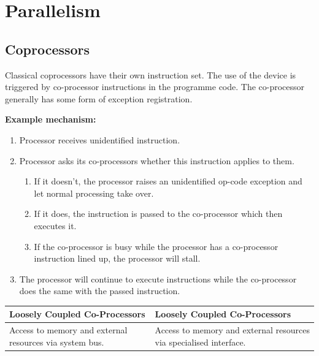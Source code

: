 \section{Parallelism }
	\subsection{Coprocessors }
	
		Classical coprocessors have their own instruction set. The use of the device is triggered by co-processor instructions in the programme code. The co-processor generally has some form of exception registration.
		
		\vspace{0.5cm}
		
		\textbf{Example mechanism:}
		
		\begin{enumerate}
		  \item Processor receives unidentified instruction.
		  \item Processor asks its co-processors whether this instruction applies to them.
		  \begin{enumerate}
			  \item If it doesn't, the processor raises an unidentified op-code exception and let normal processing take over.
			  \item If it does, the instruction is passed to the co-processor which then executes it.
			  \item If the co-processor is busy while the processor has a co-processor instruction lined up, the processor will stall.
		  \end{enumerate}	  
		  \item The processor will continue to execute instructions while the co-processor does the same with the passed instruction.
		\end{enumerate}


		\begin{table}[H]
			\centering
			\begin{tabular}{|p{0.425\textwidth}|p{}|}
				\hline
				\textbf{Loosely Coupled Co-Processors}
					& \textbf{Loosely Coupled Co-Processors}\\
				\hline
				Access to memory and external resources via system bus.
					& Access to memory and external resources via specialised interface.\\
				\hline
			\end{tabular}
		\end{table}
		

